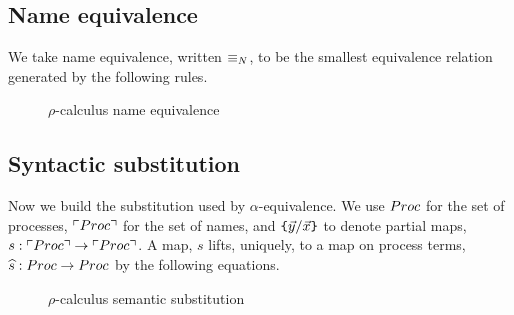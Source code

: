 \subsection{Name equivalence}

We take name equivalence, written $\mathbin{\equiv_N}$, to be the smallest
equivalence relation generated by the following rules.

\begin{figure}[hbp]
  \centering
  \caption{ $\rho$-calculus name equivalence }
\end{figure}

\subsection{Syntactic substitution}

Now we build the substitution used by $\alpha$-equivalence. We use
$\mathbin{Proc}$ for the set of processes, $\ulcorner \mathbin{Proc} \urcorner$ for the set of names, and
$\texttt{\{}\vec{y} / \vec{x} \texttt{\}}$ to denote partial maps, $s : \ulcorner \mathbin{Proc} \urcorner
\rightarrow \ulcorner \mathbin{Proc} \urcorner$. A map, $s$ lifts, uniquely, to a map on process terms, $\widehat{s} :
\mathbin{Proc} \rightarrow \mathbin{Proc}$ by the following equations.

\begin{figure}[hbp]
  \centering
  \caption{ $\rho$-calculus semantic substitution }
\end{figure}

